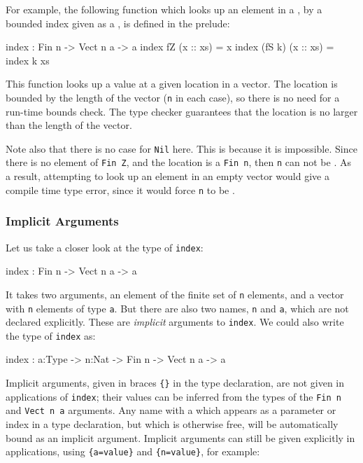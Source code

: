 For example, the following function which looks up an element in a , by a bounded index given as a , is defined in the prelude:

\begin{code}
index : Fin n -> Vect n a -> a
index fZ     (x :: xs) = x
index (fS k) (x :: xs) = index k xs
\end{code}

\noindent
This function looks up a value at a given location in a vector.
The location is bounded by the length of the vector (\texttt{n} in each case), so there is no
need for a run-time bounds check.
The type checker guarantees that the location is no larger than the length of the vector.

Note also that there is no case for \texttt{Nil} here.
This is because it is impossible. Since there is no element of \texttt{Fin Z}, and the location is a \texttt{Fin n}, then \texttt{n} can not be .
As a result, attempting to look up an element in an empty vector would give a compile time type error, since it would force \texttt{n} to be .

\subsubsection{Implicit Arguments}

Let us take a closer look at the type of \texttt{index}:

\begin{code}
index : Fin n -> Vect n a -> a
\end{code}

\noindent
It takes two arguments, an element of the finite set of \texttt{n} elements, and a vector with \texttt{n} elements of type \texttt{a}. But there are also two names, \texttt{n} and \texttt{a}, which are not declared  explicitly.
These are \emph{implicit} arguments to \texttt{index}. We could also write the type of \texttt{index} as:

\begin{code}
index : {a:Type} -> {n:Nat} -> Fin n -> Vect n a -> a
\end{code}

\noindent
Implicit arguments, given in braces \texttt{\{\}} in the type declaration, are not given in applications of \texttt{index}; their values can be inferred from the types of the \texttt{Fin n} and \texttt{Vect n a} arguments.
Any name with a  which appears as a parameter or index in a type declaration, but which is otherwise free, will be automatically bound as an implicit argument.
Implicit arguments can still be given explicitly in applications, using \texttt{\{a=value\}} and \texttt{\{n=value\}}, for example:

